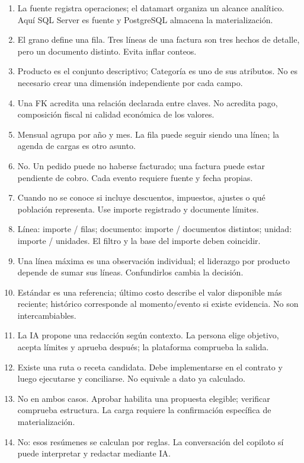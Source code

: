 {\small
\begin{enumerate}
\item La fuente registra operaciones; el datamart organiza un alcance analítico. Aquí SQL Server es fuente y PostgreSQL almacena la materialización.
\item El grano define una fila. Tres líneas de una factura son tres hechos de detalle, pero un documento distinto. Evita inflar conteos.
\item Producto es el conjunto descriptivo; Categoría es uno de sus atributos. No es necesario crear una dimensión independiente por cada campo.
\item Una FK acredita una relación declarada entre claves. No acredita pago, composición fiscal ni calidad económica de los valores.
\item Mensual agrupa por año y mes. La fila puede seguir siendo una línea; la agenda de cargas es otro asunto.
\item No. Un pedido puede no haberse facturado; una factura puede estar pendiente de cobro. Cada evento requiere fuente y fecha propias.
\item Cuando no se conoce si incluye descuentos, impuestos, ajustes o qué población representa. Use importe registrado y documente límites.
\item Línea: importe / filas; documento: importe / documentos distintos; unidad: importe / unidades. El filtro y la base del importe deben coincidir.
\item Una línea máxima es una observación individual; el liderazgo por producto depende de sumar sus líneas. Confundirlos cambia la decisión.
\item Estándar es una referencia; último costo describe el valor disponible más reciente; histórico corresponde al momento/evento si existe evidencia. No son intercambiables.
\item La IA propone una redacción según contexto. La persona elige objetivo, acepta límites y aprueba después; la plataforma comprueba la salida.
\item Existe una ruta o receta candidata. Debe implementarse en el contrato y luego ejecutarse y conciliarse. No equivale a dato ya calculado.
\item No en ambos casos. Aprobar habilita una propuesta elegible; verificar comprueba estructura. La carga requiere la confirmación específica de materialización.
\item No: esos resúmenes se calculan por reglas. La conversación del copiloto sí puede interpretar y redactar mediante IA.

\end{enumerate}}
